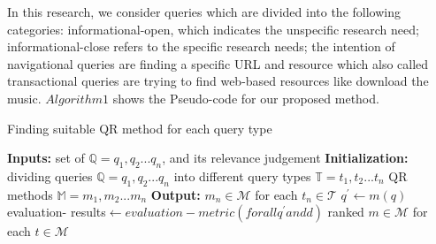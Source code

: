 \documentclass[sigconf]{acmart}
\begin{document}
In this research, we consider queries which are divided into the following categories: informational-open, which indicates the unspecific research need; informational-close refers to the specific research needs; the intention of navigational queries are finding a specific URL and resource which also called transactional queries are trying to find web-based resources like download the music\cite{carterette2009million}. $Algorithm 1$ shows the Pseudo-code for our proposed method.

\begin{algorithm}[h]
\caption{Finding suitable QR method for each query type}
\label{bicluster}
\begin{algorithmic}[1]
\Statex\textbf{Inputs:} 
\Statex\hspace{\algorithmicindent} set of $\mathbb{Q}={q_1, q_2... q_n}$, and its relevance judgement \Statex\textbf{Initialization:}
\Statex\hspace{\algorithmicindent} dividing queries $\mathbb{Q}={q_1, q_2... q_n}$ into different query types $\mathbb{T}={t_1, t_2... t_n}$
\Statex\hspace{\algorithmicindent} QR methods $\mathbb{M}={m_1, m_2... m_n}$ 
\Statex\textbf{Output:} ${m_n}\in\mathcal{M}$ for each ${t_n}\in\mathcal{T}$ 
\State ${q^'}\leftarrow{m(q)}$
\EndFor
\EndFor
{}
\EndFor
\Statex\hspace{\algorithmicindent} evaluation- results$\leftarrow{evaluation-metric(for all {q^'} and {d})}$
\Statex\hspace{\algorithmicindent}ranked $m\in\mathcal{M}$ for each $t\in\mathcal{M}$
\EndProcedure
\end{algorithmic}
\end{algorithm}



 
\end{document}
